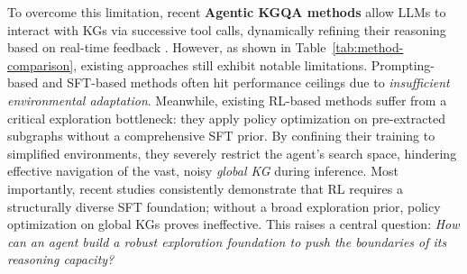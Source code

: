 

To overcome this limitation, recent \textbf{Agentic KGQA methods} allow LLMs to interact with KGs via successive tool calls, dynamically refining their reasoning based on real-time feedback \citep{yao2023reactsynergizingreasoningacting, sun2023think}.
However, as shown in Table~\ref{tab:method-comparison}, existing approaches still exhibit notable limitations.
Prompting-based and SFT-based methods \citep{sun2023think,xu2024generate,luo2023reasoning,jiang2025kg} often hit performance ceilings due to \textit{insufficient environmental adaptation}. 
Meanwhile, existing RL-based methods \citep{song2025efficient} suffer from a critical exploration bottleneck: they apply policy optimization on pre-extracted subgraphs without a comprehensive SFT prior. 
By confining their training to simplified environments, they severely restrict the agent's search space, hindering effective navigation of the vast, noisy \textit{global KG} during inference.
Most importantly, recent studies \citep{Guo_2025, zhang2026asteragenticscalingtoolintegrated, xiong2026scaling} consistently demonstrate that RL requires a structurally diverse SFT foundation; without a broad exploration prior, policy optimization on global KGs proves ineffective.
This raises a central question: \textit{How can an agent build a robust exploration foundation to push the boundaries of its reasoning capacity?}


